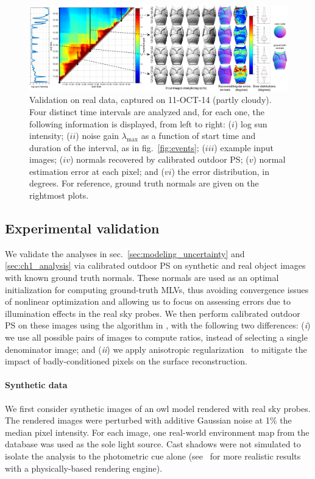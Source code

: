 \begin{figure}[t]
    \centering
    \includegraphics[width=0.92\linewidth]{./figures/realData/realData4.pdf}
    \caption[Validation on real data]{Validation on real data, captured on 11-OCT-14 (partly cloudy). Four distinct time intervals are analyzed and, for each one, the following information is displayed, from left to right: ($i$) log sun intensity; ($ii$) noise gain $\lambda_\text{max}$ as a function of start time and duration of the interval, as in fig.~\ref{fig:events}; ($iii$) example input images; ($iv$) normals recovered by calibrated outdoor PS; ($v$) normal estimation error at each pixel; and ($vi$) the error distribution, in degrees. For reference, ground truth normals are given on the rightmost plots.}
    \label{fig:real-results}
\end{figure}

\subsection{Experimental validation}

We validate the analyses in sec.~\ref{sec:modeling_uncertainty} and \ref{sec:ch1_analysis} via calibrated outdoor PS on synthetic and real object images with known ground truth normals. These normals are used as an optimal initialization for computing ground-truth MLVs, thus avoiding convergence issues of nonlinear optimization and allowing us to focus on assessing errors due to illumination effects in the real sky probes. We then perform calibrated outdoor PS on these images using the algorithm in \cite{yu-iccp-13}, with the following two differences: (\emph{i}) we use all possible pairs of images to compute ratios, instead of selecting a single denominator image; and (\emph{ii}) we apply anisotropic regularization~\cite{hernandez-pami-11} to mitigate the impact of badly-conditioned pixels on the surface reconstruction.

%
\paragraph{Synthetic data}%
%
We first consider synthetic images of an owl model rendered with real sky probes. The rendered images were perturbed with additive Gaussian noise at 1\% the median pixel intensity. For each image, one real-world environment map from the database was used as the sole light source. Cast shadows were not simulated to isolate the analysis to the photometric cue alone (see~\cite{webpageXhourPS} for more realistic results with a physically-based rendering engine). 


